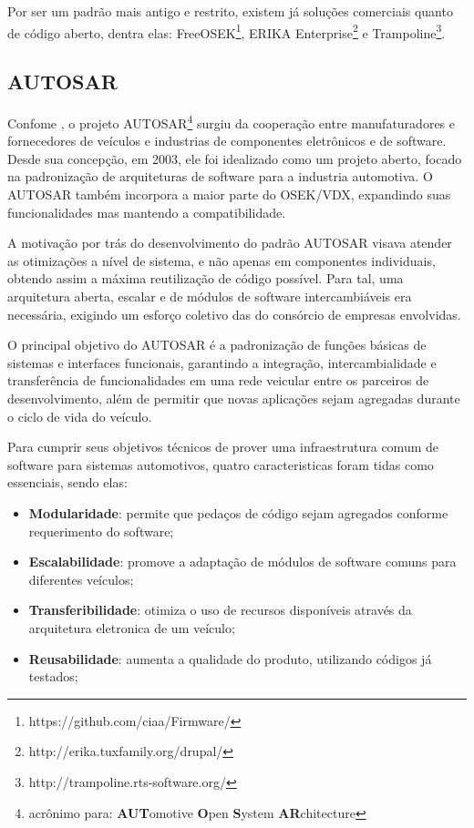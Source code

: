 Por ser um padrão mais antigo e restrito, existem já soluções comerciais quanto de código aberto, dentra elas: FreeOSEK\footnote{https://github.com/ciaa/Firmware/}, ERIKA Enterprise\footnote{http://erika.tuxfamily.org/drupal/} e Trampoline\footnote{http://trampoline.rts-software.org/}.

\subsection{AUTOSAR}

Confome , o projeto AUTOSAR\footnote{acrônimo para: \textbf{AUT}omotive \textbf{O}pen \textbf{S}ystem \textbf{AR}chitecture} surgiu da cooperação entre manufaturadores e fornecedores de veículos e industrias de componentes eletrônicos e de software. Desde sua concepção, em 2003, ele foi idealizado como um projeto aberto, focado na padronização de arquiteturas de software para a industria automotiva. O AUTOSAR também incorpora a maior parte do OSEK/VDX, expandindo suas funcionalidades mas mantendo a compatibilidade.

A motivação por trás do desenvolvimento do padrão AUTOSAR visava atender as otimizações a nível de sistema, e não apenas em componentes individuais, obtendo assim a máxima reutilização de código possível. Para tal, uma arquitetura aberta, escalar e de módulos de software intercambiáveis era necessária, exigindo um esforço coletivo das do consórcio de empresas envolvidas.

O principal objetivo do AUTOSAR é a padronização de funções básicas de sistemas e interfaces funcionais, garantindo a integração, intercambialidade e transferência de funcionalidades em uma rede veicular entre os parceiros de desenvolvimento, além de permitir que novas aplicações sejam agregadas durante o ciclo de vida do veículo.


Para cumprir seus objetivos técnicos de prover uma infraestrutura comum de software para sistemas automotivos, quatro caracteristicas foram tidas como essenciais, sendo elas:

\begin{itemize}
	\item \textbf{Modularidade}: permite que pedaços de código sejam agregados conforme requerimento do software;
	\item \textbf{Escalabilidade}: promove a adaptação de módulos de software comuns para diferentes veículos;
	\item \textbf{Transferibilidade}: otimiza o uso de recursos disponíveis através da arquitetura eletronica de um veículo;
	\item \textbf{Reusabilidade}: aumenta a qualidade do produto, utilizando códigos já testados;
\end{itemize}

